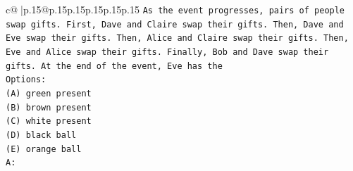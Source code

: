 \documentclass{article}
\begin{document}
{\begin{supertabular}{c@{$\;$}|p{.15\linewidth}@{}p{.15\linewidth}p{.15\linewidth}p{.15\linewidth}p{.15\linewidth}p{.15\linewidth}}
{{{\texttt{As the event progresses, pairs of people swap gifts. First, Dave and Claire swap their gifts. Then, Dave and Eve swap their gifts. Then, Alice and Claire swap their gifts. Then, Eve and Alice swap their gifts. Finally, Bob and Dave swap their gifts. At the end of the event, Eve has the} \\
\texttt{Options:} \\
\texttt{(A) green present} \\
\texttt{(B) brown present} \\
\texttt{(C) white present} \\
\texttt{(D) black ball} \\
\texttt{(E) orange ball} \\
\texttt{A:} \\
            }
        }
    }
     \\ \\


\end{supertabular}}
\end{document}

